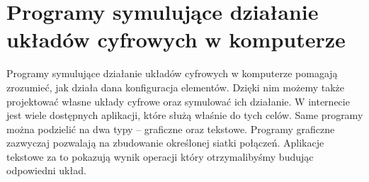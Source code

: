 \documentclass[12pt, a4paper, onside, polish]{article}				%
\begin{document}
\setlength\parindent{24pt}




\cleardoublepage

      


\section{Programy symulujące działanie układów cyfrowych w komputerze}
\hspace{\parindent}
Programy symulujące działanie układów cyfrowych w komputerze pomagają zrozumieć, jak działa dana konfiguracja elementów. Dzięki nim możemy także projektować własne układy cyfrowe oraz symulować ich działanie. W internecie jest wiele dostępnych aplikacji, które służą właśnie do tych celów. Same programy można podzielić na dwa typy – graficzne oraz tekstowe. Programy graficzne zazwyczaj pozwalają na zbudowanie określonej siatki połączeń. Aplikacje tekstowe za to pokazują wynik operacji który otrzymalibyśmy budując odpowiedni układ.  
\cleardoublepage
\end{document}
